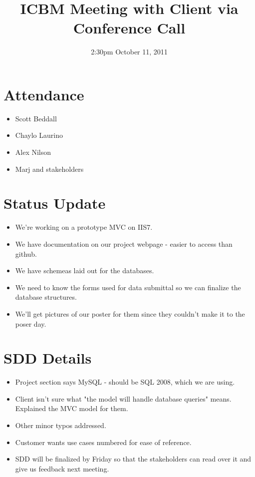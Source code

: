 \documentclass{article}
\begin{document}
\title{ICBM Meeting with Client via Conference Call}
\date{2:30pm October 11, 2011}
\maketitle

\section{Attendance}
\begin{itemize}
\item Scott Beddall 
\item Chaylo Laurino
\item Alex Nilson
\item Marj and stakeholders
\end{itemize}

\section{Status Update}
\begin{itemize}
\item We're working on a prototype MVC on IIS7.
\item We have documentation on our project webpage - easier to access than github.
\item We have schemeas laid out for the databases.
\item We need to know the forms used for data submittal so we can finalize the database structures.
\item We'll get pictures of our poster for them since they couldn't make it to the poser day.
\end{itemize}

\section{SDD Details}
\begin{itemize}
\item Project section says MySQL - should be SQL 2008, which we are using.
\item Client isn't sure what "the model will handle database queries" means.  Explained the MVC model for them.
\item Other minor typos addressed.
\item Customer wants use cases numbered for ease of reference.
\item SDD will be finalized by Friday so that the stakeholders can read over it and give us feedback next meeting.
\end{itemize}
 
\end{document}
